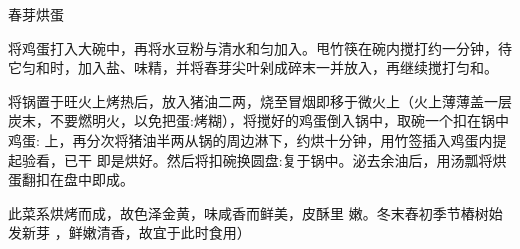 \begin{recipe}{春芽烘蛋}

\ingredients


\preparation

\step 将鸡蛋打入大碗中，再将水豆粉与清水和匀加入。甩竹筷在碗内搅打约一分钟，待
它匀和时，加入盐、味精，并将春芽尖叶剁成碎末一并放入，再继续搅打匀和。

\step 将锅置于旺火上烤热后，放入猪油二两，烧至冒烟即移于微火上（火上薄薄盖一层
炭末，不要燃明火，以免把蛋:烤糊），将搅好的鸡蛋倒入锅中，取碗一个扣在锅中鸡蛋:
上，再分次将猪油半两从锅的周边淋下，约烘十分钟，用竹签插入鸡蛋内提起验看，已干
即是烘好。然后将扣碗换圆盘:复于锅中。泌去余油后，用汤瓢将烘蛋翻扣在盘中即成。

\features

此菜系烘烤而成，故色泽金黄，味咸香而鲜美，皮酥里 嫩。冬末舂初季节樁树始发新芽
，鲜嫩清香，故宜于此时食用）

\end{recipe}

